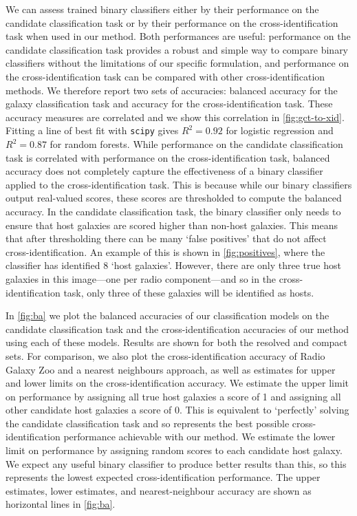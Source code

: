     {We can assess trained binary classifiers either by their performance on
    the candidate classification task or by their performance on the
    cross-identification task when used in our method. Both performances are
    useful: performance on the candidate classification task provides a robust
    and simple way to compare binary classifiers without the limitations of
    our specific formulation, and performance on the cross-identification task
    can be compared with other cross-identification methods. We therefore
    report two sets of accuracies: balanced accuracy for the galaxy
    classification task and accuracy for the cross-identification task. These
    accuracy measures are correlated and we show this correlation in
    \autoref{fig:gct-to-xid}. Fitting a line of best fit with \texttt{scipy}
    gives $R^2 = 0.92$ for logistic regression and $R^2 = 0.87$ for random
    forests. While performance on the candidate classification task is correlated
    with performance on the cross-identification task, balanced accuracy does
    not completely capture the effectiveness of a binary classifier applied to
    the cross-identification task. {This is because while our binary
    classifiers output real-valued scores, these scores are thresholded to
    compute the balanced accuracy}. In the candidate classification
    task, the binary classifier only needs to ensure that host galaxies are
    {scored higher} than non-host galaxies. This means
    {that after thresholding} there can be
    many `false positives' that do not affect cross-identification. An example
    of this is shown in \autoref{fig:positives}, where the classifier has
    identified 8 `host galaxies'. However, there are only three true host
    galaxies in this image---one per radio component---and so in the
    cross-identification task, only three of these galaxies will be identified
    as hosts.}

    In \autoref{fig:ba} we plot {the balanced accuracies of our classification models
    on the candidate classification task and the cross-identification
    accuracies of our method using each of these models. Results are shown for both
    the resolved and compact sets.} For comparison, we also plot the cross-identification accuracy of Radio Galaxy
    Zoo and a nearest neighbours approach, as well as estimates for upper and
    lower limits on the cross-identification accuracy. {We estimate the upper limit on performance by assigning all
    true host galaxies a score of 1 and
    assigning all other candidate host galaxies a score of 0. This
    is equivalent to `perfectly' solving the candidate classification task and so
    represents the best possible cross-identification performance achievable
    with our method. We estimate the lower limit on performance by {
    assigning random scores to each candidate host galaxy}. We expect any
    useful binary classifier to produce better
    results than this, so this represents the lowest expected
    cross-identification performance.} The upper estimates, lower estimates,
    and nearest-neighbour accuracy are shown as horizontal lines in
    \autoref{fig:ba}.

